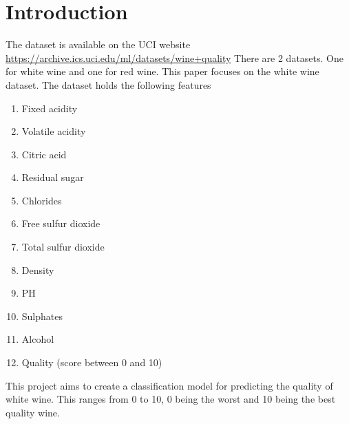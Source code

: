 \section{Introduction}

The dataset is available on the UCI website \url{https://archive.ics.uci.edu/ml/datasets/wine+quality} There are 2 datasets. One for white wine and one for red wine. This paper focuses on the white wine dataset. The dataset holds the following features

\begin{enumerate}
  \item Fixed acidity 
  \item Volatile acidity
  \item Citric acid 
  \item Residual sugar 
  \item Chlorides
  \item Free sulfur dioxide 
  \item Total sulfur dioxide 
  \item Density
  \item PH
  \item Sulphates
  \item Alcohol
  \item Quality (score between 0 and 10)
\end{enumerate}

This project aims to create a classification model for predicting the quality of white wine. This ranges from 0 to 10, 0 being the worst and 10 being the best quality wine.
